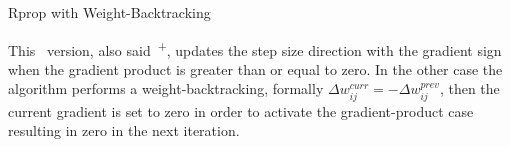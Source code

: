 \begin{subsection}{Rprop with Weight-Backtracking}
    \label{subsec:rpropplus}
    \par This~ version, also said~\textsuperscript{+}, updates the step size direction with the gradient sign when the gradient product is greater than or equal to zero. In the other case the algorithm performs a weight-backtracking, formally $\Delta w_{ij}^{curr} = -\Delta w_{ij}^{prev}$, then the current gradient is set to zero in order to activate the gradient-product case resulting in zero in the next iteration.
    
    \clearpage
\end{subsection}
